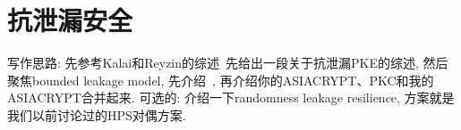 \section{抗泄漏安全}
写作思路: 先参考Kalai和Reyzin的综述~\cite{KR-ePrint-2019}先给出一段关于抗泄漏PKE的综述, 
然后聚焦bounded leakage model, 先介绍~\cite{NS-CRYPTO-2009}, 再介绍你的ASIACRYPT、PKC和我的ASIACRYPT合并起来. 
可选的: 介绍一下randomness leakage resilience, 方案就是我们以前讨论过的HPS对偶方案.  